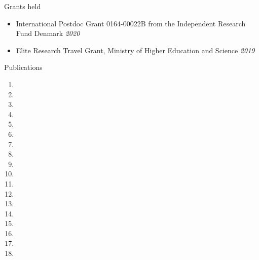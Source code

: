 \documentclass{resume} %
\begin{document}
\begin{rSection}{Grants held}
\begin{itemize}
\item International Postdoc Grant 
0164-00022B from the Independent Research Fund Denmark  \hfill{\emph{2020}} 
\item Elite Research Travel Grant, Ministry of Higher Education and Science  \hfill{\emph{2019}} 
\end{itemize}
\end{rSection}





\begin{rSection}{Publications}

\begin{enumerate}
	\item {}
	\item {}
	\item {}
	\item {}
	\item {}
	\item {}
	\item {}
	\item {}
	\item {}
	\item {}
	\item {}
	\item {}
	\item {}
	\item {}
	\item {}
	\item {}
	\item {}
	\item {}
	\end{enumerate}
\end{rSection}
\end{document}
